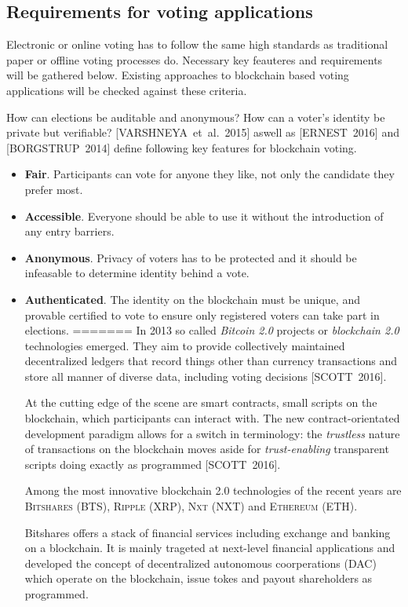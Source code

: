 \documentclass[9pt,oneside]{amsart}
\begin{document}
\begin{multicols}{2}
\subsection{Requirements for voting applications}
\label{sec:req}
Electronic or online voting has to follow the same high standards as traditional paper or offline voting processes do. Necessary key feauteres and requirements will be gathered below. Existing approaches to blockchain based voting applications will be checked against these criteria.\par
How can elections be auditable and anonymous? How can a voter's identity be private but verifiable? [VARSHNEYA~et~al.~2015] aswell as [ERNEST~2016] and [BORGSTRUP~2014] define following key features for blockchain voting.
\begin{itemize}
\item \textbf{Fair}. Participants can vote for anyone they like, not only the candidate they prefer most.
\item \textbf{Accessible}. Everyone should be able to use it without the introduction of any entry barriers.
\item \textbf{Anonymous}. Privacy of voters has to be protected and it should be infeasable to determine identity behind a vote. %
\item \textbf{Authenticated}. The identity on the blockchain must be unique, and provable certified to vote to ensure only registered voters can take part in elections.
=======
In 2013 so called \textit{Bitcoin 2.0} projects or \textit{blockchain 2.0} technologies emerged. They aim to provide collectively maintained decentralized ledgers that record things other than currency transactions and store all manner of diverse data, including voting decisions [SCOTT~2016].\par
At the cutting edge of the scene are smart contracts, small scripts on the blockchain, which participants can interact with. The new contract-orientated development paradigm allows for a switch in terminology: the \textit{trustless} nature of transactions on the blockchain moves aside for \textit{trust-enabling} transparent scripts doing exactly as programmed [SCOTT~2016].\par
Among the most innovative blockchain 2.0 technologies of the recent years are \textsc{Bitshares (BTS)}, \textsc{Ripple (XRP)}, \textsc{Nxt (NXT)} and \textsc{Ethereum (ETH)}.\par
Bitshares offers a stack of financial services including exchange and banking on a blockchain. It is mainly trageted at next-level financial applications and developed the concept of decentralized autonomous coorperations (\textsc{DAC}) which operate on the blockchain, issue tokes and payout shareholders as programmed.\par

\end{itemize}
\end{multicols}
\end{document}
